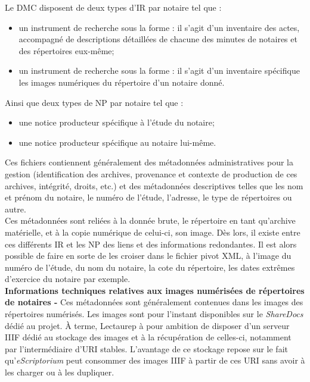 Le DMC disposent de deux types d'IR par notaire tel que :
\begin{itemize}
    \item un instrument de recherche sous la forme  : il s'agit d'un inventaire des actes, accompagné de descriptions détaillées de chacune des minutes de notaires et des répertoires eux-même;
    \item un instrument de recherche sous la forme  : il s'agit d'un inventaire spécifique les images numériques du répertoire d'un notaire donné.
\end{itemize}
Ainsi que deux types de NP par notaire tel que :
\begin{itemize}
    \item une notice producteur spécifique à l'étude du notaire;
    \item une notice producteur spécifique au notaire lui-même.
\end{itemize}
Ces fichiers contiennent généralement des métadonnées administratives pour la gestion (identification des archives, provenance et contexte de production de ces archives, intégrité, droits, etc.) et des métadonnées descriptives telles que les nom et prénom du notaire, le numéro de l'étude, l'adresse, le type de répertoires ou autre. \\

Ces  métadonnées sont reliées à la donnée brute, le répertoire en tant qu'archive matérielle, et à la copie numérique de celui-ci, son image. Dès lors, il existe entre ces différents IR et les NP des liens et des informations redondantes. Il est alors possible de faire en sorte de les croiser dans le fichier pivot XML, à l'image du numéro de l'étude, du nom du notaire, la cote du répertoire, les dates extrêmes d'exercice du notaire par exemple.\\

\textbf{Informations techniques relatives aux images numérisées de répertoires de notaires -} Ces métadonnées sont généralement contenues dans les images des répertoires numérisés. Les images sont pour l'instant disponibles sur le \textit{ShareDocs} dédié au projet. À terme, Lectaurep à pour ambition de disposer d'un serveur IIIF dédié au stockage des images et à la récupération de celles-ci, notamment par l'intermédiaire d'URI stables. L'avantage de ce stockage repose sur le fait qu'\textit{eScriptorium} peut consommer des images IIIF à partir de ces URI sans avoir à les charger ou à les dupliquer.\\

